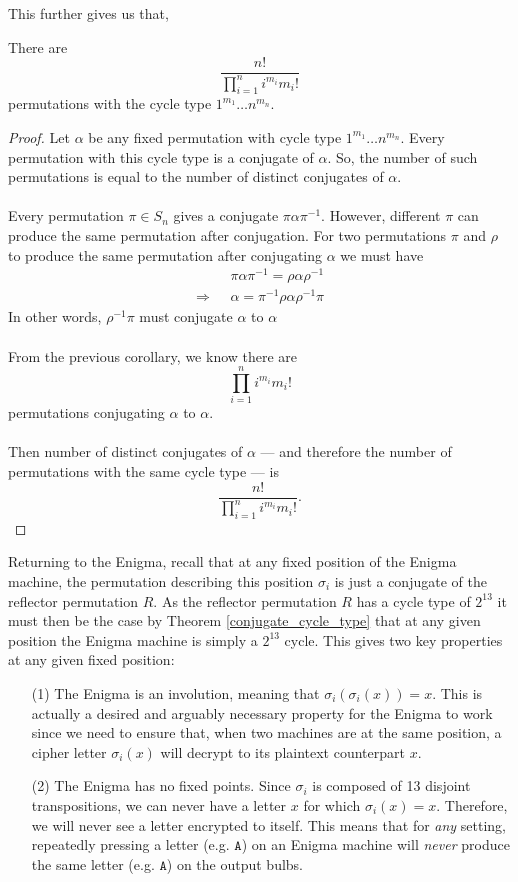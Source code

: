 \noindent This further gives us that, 
\begin{corr}\label{cycle_count}
    There are 
    \[
    \frac{n!}{\prod_{i=1}^n{i^{m_i}m_i!}}
    \]
    permutations with the cycle type $1^{m_1}\dots n^{m_n}$.
\end{corr}
\begin{proof}
Let $\alpha$ be any fixed permutation with cycle type $1^{m_1} \dots n^{m_n}$. Every permutation with this cycle type is a conjugate of $\alpha$. So, the number of such permutations is equal to the number of distinct conjugates of $\alpha$.
\\\\Every permutation $\pi \in S_n$ gives a conjugate $\pi \alpha \pi^{-1}$. However, different $\pi$ can produce the same permutation after conjugation. For two permutations $\pi$ and $\rho$ to produce the same permutation after conjugating $\alpha$ we must have 
\begin{align*}
&\pi\alpha\pi^{-1} = \rho\alpha\rho^{-1}\\
\Rightarrow\text{ }&\alpha = \pi^{-1}\rho\alpha\rho^{-1}\pi
\end{align*}
In other words, $\rho^{-1}\pi$ must conjugate $\alpha$ to $\alpha$
\\\\From the previous corollary, we know there are
\[
\prod_{i=1}^{n} i^{m_i} m_i!
\]
permutations conjugating $\alpha$ to $\alpha$.  
\\\\Then number of distinct conjugates of $\alpha$ — and therefore the number of permutations with the same cycle type — is
\[
\frac{n!}{\prod_{i=1}^n i^{m_i} m_i!}.
\]
\end{proof}
\noindent Returning to the Enigma, recall that at any fixed position of the Enigma machine, the
permutation describing this position $\sigma_i$ is just a conjugate
of the reflector permutation $R$. As the reflector permutation $R$ has a cycle type
of $2^{13}$ it must then be the case by Theorem
\ref{conjugate_cycle_type} that at any given position the Enigma
machine is simply a $2^{13}$ cycle. This gives two key properties at
any given fixed position:
\begin{itemize}
\item[(1)] The Enigma is an involution, meaning that $\sigma_i(\sigma_i(x))
= x$. This is actually a desired and arguably necessary property for
the Enigma to work since we need to ensure that, when two
machines are at the same position, a cipher letter $\sigma_i(x)$ will
decrypt to its plaintext counterpart $x$.
\item[(2)] The Enigma has no fixed points. Since $\sigma_i$ is composed of
13 disjoint transpositions, we can never have a letter $x$ for which
$\sigma_i(x) = x$. Therefore, we will never see a letter encrypted to
itself. This means that for \emph{any} setting, repeatedly pressing a letter (e.g. $\texttt{A}$) on an Enigma machine
 will \emph{never} produce the same letter
(e.g. $\texttt{A}$) on the output bulbs.
\end{itemize}
